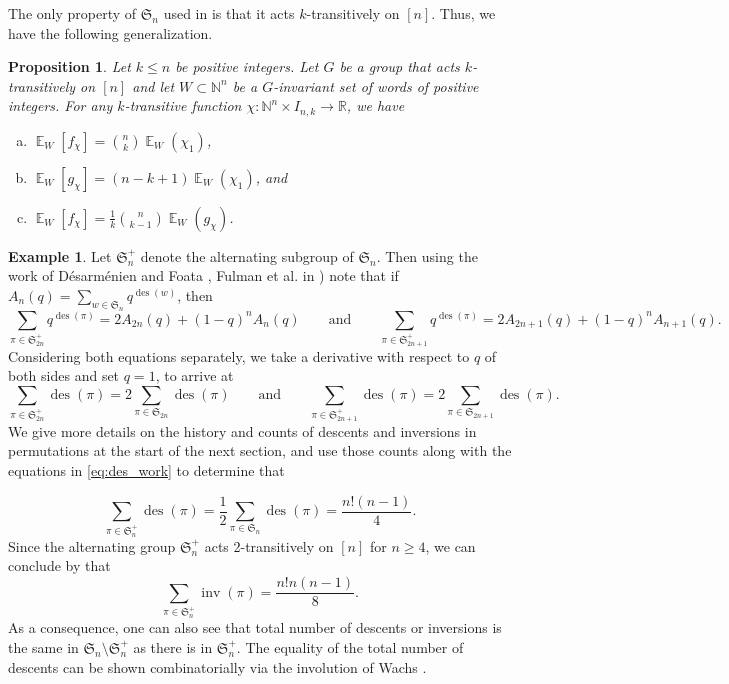\documentclass{amsart}
\newcommand{\N}{\mathbb{N}}
\newcommand{\R}{\mathbb{R}}
\renewcommand{\S}{\mathfrak{S}}
\DeclareMathOperator{\des}{des}
\DeclareMathOperator{\inv}{inv}
\DeclareMathOperator{\E}{\mathbb{E}}
\newtheorem{proposition}[theorem]{Proposition}
\theoremstyle{definition}
\newtheorem{example}[theorem]{Example}
\begin{document}
   The only property of $\S_n$ used in  is that it acts $k$-transitively on $[n]$.  Thus, we have the following generalization.
    \begin{proposition}\label{prop:2-transitive-G-invariant-words}
      Let $k\leq n$ be positive integers. Let $G$ be a group that acts $k$-transitively on $[n]$ and let $W\subset \N^{n}$ be a $G$-invariant set of words of positive integers. For any $k$-transitive function $\chi:\N^n\times I_{n,k}\to \R$, we have
\begin{enumerate}[(a)]
    \item $\E_W[f_\chi]=\binom{n}{k}\E_W(\chi_1)$,
    \item $\E_W[g_\chi]=(n-k+1)\E_W(\chi_1)$, and
    \item $\E_W[f_\chi]=\frac{1}{k}\binom{n}{k-1}\E_W(g_\chi)$.
\end{enumerate}
    \end{proposition}
    \begin{example}\label{ex:alternating_subgroup}    
    Let $\S_n^+$ denote the alternating subgroup of $\S_n$. Then using the work of D{\'e}sarm{\'e}nien and Foata \cite{desarmenien1992signed}, Fulman et al. in \cite[Eqn.~(7)]{fulman2021jointdistributiondescentssigns}) note that if $A_n(q)=\sum_{w\in \S_n}q^{\des(w)}$, then 
    \[\sum_{\pi\in \S_{2n}^{+}}q^{\des(\pi)}=2A_{2n}(q)+(1-q)^nA_{n}(q)\qquad \mbox{and} \qquad \sum_{\pi\in \S_{2n+1}^{+}}q^{\des(\pi)}=2A_{2n+1}(q)+(1-q)^nA_{n+1}(q).\]
    Considering both equations separately, we take a derivative with respect to $q$ of both sides and set $q=1$, to arrive at
\begin{equation}\label{eq:des_work}
\sum_{\pi\in\S_{2n}^{+}}\des(\pi)=2\sum_{\pi\in\mathfrak{S}_{2n}}\des(\pi) \qquad \mbox{and} \qquad \sum_{\pi\in\S_{2n+1}^{+}}\des(\pi)=2\sum_{\pi\in\mathfrak{S}_{2n+1}}\des(\pi).\end{equation}
We give more details on the history and counts of descents and inversions in permutations at the start of the next section, and use those counts along with the equations in \eqref{eq:des_work} to determine that

    \begin{equation}
        \sum_{\pi\in \S^+_{n}}\des(\pi)=\frac{1}{2}\sum_{\pi\in \S_{n}}\des(\pi)=\frac{n!(n-1)}{4}.
    \end{equation}
    Since the alternating group $\S_n^{+}$ acts 2-transitively on $[n]$ for $n\geq 4$, we can conclude by  that 
    \begin{equation}
         \sum_{\pi\in \S^+_{n}}\inv(\pi) = \frac{n!n(n-1)}{8}.
    \end{equation}
    As a consequence, one can also see that total number of descents or inversions is the same in $\S_n\setminus \S_n^{+}$ as there is in $\S_n^+$. The equality of the total number of descents can be shown combinatorially via the involution of Wachs \cite{WACHS199259}.
\end{example}
\end{document}
